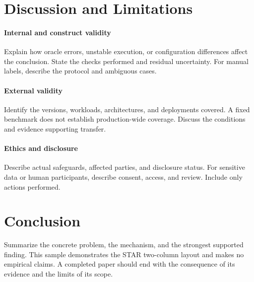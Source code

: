 \section{Discussion and Limitations}
\paragraph{Internal and construct validity}
Explain how oracle errors, unstable execution, or configuration differences
affect the conclusion. State the checks performed and residual uncertainty.
For manual labels, describe the protocol and ambiguous cases.

\paragraph{External validity}
Identify the versions, workloads, architectures, and deployments covered.
A fixed benchmark does not establish production-wide coverage. Discuss
the conditions and evidence supporting transfer.

\paragraph{Ethics and disclosure}
Describe actual safeguards, affected parties, and disclosure status.
For sensitive data or human participants, describe consent, access,
and review. Include only actions performed.

\section{Conclusion}
Summarize the concrete problem, the mechanism, and the strongest supported
finding. This sample demonstrates the STAR two-column layout and makes no
empirical claims. A completed paper should end with the consequence of its
evidence and the limits of its scope.

